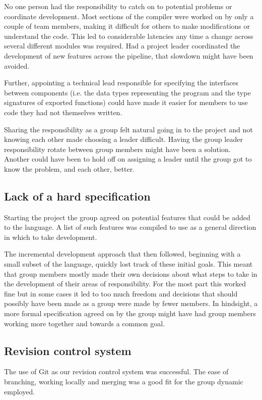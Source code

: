 No one person had the responsibility to catch on to potential problems or coordinate development. Most sections of the compiler were worked on by only a couple of team members, making it difficult for others to make modifications or understand the code. This led to considerable latencies any time a change across several different modules was required. Had a project leader coordinated the development of new features across the pipeline, that slowdown might have been avoided.

Further, appointing a technical lead responsible for specifying the interfaces between components (i.e. the data types representing the program and the type signatures of exported functions) could have made it easier for members to use code they had not themselves written.

Sharing the responsibility as a group felt natural going in to the project and not knowing each other made choosing a leader difficult. Having the group leader responsibility rotate between group members might have been a solution. Another could have been to hold off on assigning a leader until the group got to know the problem, and each other, better.

\subsection{Lack of a hard specification}

Starting the project the group agreed on potential features that could be added to the language. A list of such features was compiled to use as a general direction in which to take development. 

The incremental development approach that then followed, beginning with a small subset of the language, quickly lost track of these initial goals. This meant that group members mostly made their own decisions about what steps to take in the development of their areas of responsibility. For the most part this worked fine but in some cases it led to too much freedom and decisions that should possibly have been made as a group were made by fewer members. In hindsight, a more formal specification agreed on by the group might have had group members working more together and towards a common goal.

\subsection{Revision control system}

The use of Git \cite{git} as our revision control system was successful. The ease of branching, working locally and merging was a good fit for the group dynamic employed. 

